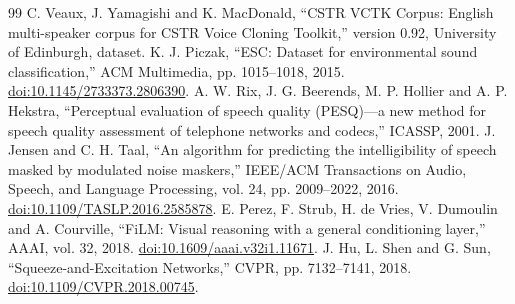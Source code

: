 \documentclass[10pt,a4paper]{article}
\begin{document}
\begin{thebibliography}{99}
 C. Veaux, J. Yamagishi and K. MacDonald, ``CSTR VCTK Corpus: English multi-speaker corpus for CSTR Voice Cloning Toolkit,'' version 0.92, University of Edinburgh, dataset.
 K. J. Piczak, ``ESC: Dataset for environmental sound classification,'' ACM Multimedia, pp. 1015--1018, 2015. \href{https://doi.org/10.1145/2733373.2806390}{doi:10.1145/2733373.2806390}.
 A. W. Rix, J. G. Beerends, M. P. Hollier and A. P. Hekstra, ``Perceptual evaluation of speech quality (PESQ)---a new method for speech quality assessment of telephone networks and codecs,'' ICASSP, 2001.
 J. Jensen and C. H. Taal, ``An algorithm for predicting the intelligibility of speech masked by modulated noise maskers,'' IEEE/ACM Transactions on Audio, Speech, and Language Processing, vol. 24, pp. 2009--2022, 2016. \href{https://doi.org/10.1109/TASLP.2016.2585878}{doi:10.1109/TASLP.2016.2585878}.
 E. Perez, F. Strub, H. de Vries, V. Dumoulin and A. Courville, ``FiLM: Visual reasoning with a general conditioning layer,'' AAAI, vol. 32, 2018. \href{https://doi.org/10.1609/aaai.v32i1.11671}{doi:10.1609/aaai.v32i1.11671}.
 J. Hu, L. Shen and G. Sun, ``Squeeze-and-Excitation Networks,'' CVPR, pp. 7132--7141, 2018. \href{https://doi.org/10.1109/CVPR.2018.00745}{doi:10.1109/CVPR.2018.00745}.
\end{thebibliography}
\end{document}
